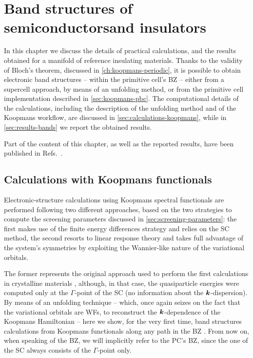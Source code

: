 \cleardoublepage
\chapter[Band structures of semiconductors and insulators]{Band structures of semiconductors\break and insulators\label{ch:band-structures}}
In this chapter we discuss the details of practical calculations, and the results obtained for a manifold of reference insulating materials. Thanks to the validity of Bloch's theorem, discussed in \cref{ch:koopmans-periodic}, it is possible to obtain electronic band structures -- within the primitive cell's BZ -- either from a supercell approach, by means of an unfolding method, or from the primitive cell implementation described in \cref{sec:koopmans-pbc}. The computational details of the calculations, including the description of the unfolding method and of the Koopmans workflow, are discussed in \cref{sec:calculations-koopmans}, while in \cref{sec:results-bands} we report the obtained results.

Part of the content of this chapter, as well as the reported results, have been published in Refs.~\cite{de_gennaro_blochs_2022,colonna_koopmans_2022}.

\clearpage
\section{Calculations with Koopmans functionals\label{sec:calculations-koopmans}}
Electronic-structure calculations using Koopmans spectral functionals are performed following two different approaches, based on the two strategies to compute the screening parameters discussed in \cref{sec:screening-parameters}: the first makes use of the finite energy differences strategy and relies on the SC method, the second resorts to linear response theory and takes full advantage of the system's symmetries by exploiting the Wannier-like nature of the variational orbitals.

The former represents the original approach used to perform the first calculations in crystalline materials \cite{nguyen_koopmans-compliant_2018}, although, in that case, the quasiparticle energies were computed only at the $\Gamma$-point of the SC (no information about the ${\bm k}$-dispersion). By means of an unfolding technique -- which, once again seizes on the fact that the variational orbitals are WFs, to reconstruct the ${\bm k}$-dependence of the Koopmans Hamiltonian -- here we show, for the very first time, band structures calculations from Koopmans functionals along any path in the BZ \cite{de_gennaro_blochs_2022}. From now on, when speaking of the BZ, we will implicitly refer to the PC's BZ, since the one of the SC always consists of the $\Gamma$-point only.

